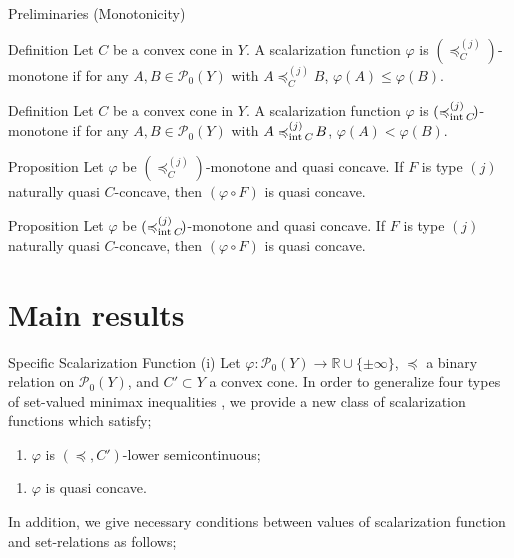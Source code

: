 \documentclass[aspectratio=169, dvipdfmx, 11pt]{beamer}
\newcommand{\RealNumberSet}{\mathbb{R}}
\newcommand{\Interior}[1]{\text{\rm int\:${#1}$}} %
\newcommand{\pow}[1]{\mathcal{P}_{0}(#1)}
\newcommand{\setrel}[2]{\preccurlyeq^{(#1)}_{#2}\!}
\begin{document}
\begin{frame}{Preliminaries (Monotonicity)}
  \begin{block}{Definition}
    Let $C$ be a convex cone in $Y$.
    A scalarization function $\varphi$ is $(\setrel{j}{C})$-monotone if
    for any $A, B \in \pow{Y}$ with
    $A \setrel{j}{C} B$, $\varphi (A) \leq \varphi (B)$.
  \end{block}

  \begin{block}{Definition}
    Let $C$ be a convex cone in $Y$.
    A scalarization function $\varphi$ is $(\setrel{j}{\Interior{C}})$-monotone if
    for any $A, B \in \pow{Y}$ with
    $A \setrel{j}{\Interior{C}} B$, $\varphi (A) < \varphi (B)$.
  \end{block}

  \begin{block}{Proposition}
    Let $\varphi$ be $(\setrel{j}{C})$-monotone and quasi concave.
    If $F$ is type $(j)$ naturally quasi $C$-concave,
    then $(\varphi \circ F)$ is quasi concave.
  \end{block}

  \begin{block}{Proposition}
    Let $\varphi$ be $(\setrel{j}{\Interior{C}})$-monotone and quasi concave.
    If $F$ is type $(j)$ naturally quasi $C$-concave,
    then $(\varphi \circ F)$ is quasi concave.
  \end{block}
\end{frame}

\section{Main results}

\begin{frame}{Specific Scalarization Function (i)}
  Let $\varphi: \pow{Y} \to \RealNumberSet \cup \{\pm \infty\}$, $\preccurlyeq$ a binary relation
  on $\pow{Y}$, and $C' \subset Y$  a convex cone.
  In order to generalize four types of set-valued minimax inequalities \cite{MR2778674},
  we provide a new class of scalarization functions which satisfy;
  \begin{enumerate}[(sc)]
    \item $\varphi$ is $(\preccurlyeq, C')$-lower semicontinuous;
  \end{enumerate}
  \begin{enumerate}[(qv)]
    \item $\varphi$ is quasi concave.
  \end{enumerate}
  In addition, we give necessary conditions between values of
  scalarization function and set-relations as follows;
\end{frame}
\end{document}
